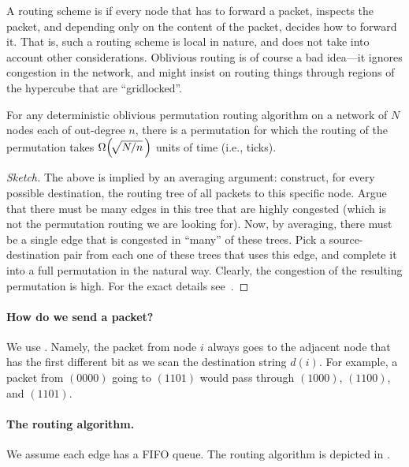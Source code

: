 A routing scheme is  if every node that has to
forward a packet, inspects the packet, and depending only on the
content of the packet, decides how to forward it. That is, such a
routing scheme is local in nature, and does not take into account
other considerations. Oblivious routing is of course a bad idea---it
ignores congestion in the network, and might insist on routing things
through regions of the hypercube that are ``gridlocked''.


\begin{theorem}
    For any deterministic oblivious permutation routing algorithm on a
    network of $N$ nodes each of out-degree $n$, there is a
    permutation for which the routing of the permutation takes
    $\Omega\pth{\! \sqrt{N/n}\, }$ units of time (i.e., ticks).
\end{theorem}

\begin{proof}[Sketch]
    The above is implied by an averaging argument: construct, for every
    possible destination, the routing tree of all packets to this specific
    node. Argue that there must be many edges in this tree that are highly
    congested (which is not the permutation routing we are looking for).
    Now, by averaging, there must be a single edge that is congested in
    ``many'' of these trees. Pick a source-destination pair from each one
    of these trees that uses this edge, and complete it into a full
    permutation in the natural way. Clearly, the congestion of the
    resulting permutation is high. For the exact details see~\cite{kkt-tborh-91}.
\end{proof}

\paragraph*{How do we send a packet?}

We use .  Namely, the packet from node $i$
always goes to the adjacent node that has the first different bit as we
scan the destination string $d(i)$. For example, a packet from
$(0000)$ going to $(1101)$ would pass through $(1000)$, $(1100)$, and
$(1101)$.

\paragraph*{The routing algorithm.}
We assume each edge has a FIFO queue. The routing algorithm is
depicted in .


